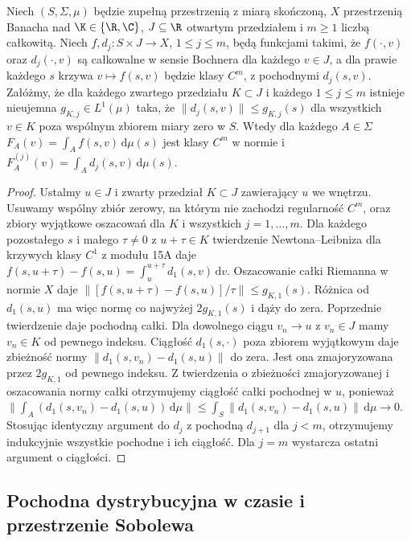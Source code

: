 \begin{wniosek}
\label{cor:dominated-parameter-derivatives15b}
Niech $(S,\Sigma,\mu)$ będzie zupełną przestrzenią z
miarą skończoną, $X$ przestrzenią Banacha nad $\K\in\{\R,\C\}$,
$J\subseteq\R$ otwartym przedziałem i $m\ge1$ liczbą
całkowitą. Niech $f,d_j:S\times J\to X$, $1\le j\le m$,
będą funkcjami takimi, że $f(\cdot,v)$ oraz $d_j(\cdot,v)$
są całkowalne w sensie Bochnera dla każdego $v\in J$,
a dla prawie każdego $s$ krzywa $v\mapsto f(s,v)$
będzie klasy $C^m$, z pochodnymi $d_j(s,v)$.
Załóżmy, że dla każdego zwartego przedziału $K\subset J$
i każdego $1\le j\le m$ istnieje nieujemna
$g_{K,j}\in L^1(\mu)$ taka, że
$\|d_j(s,v)\|\le g_{K,j}(s)$ dla wszystkich $v\in K$
poza wspólnym zbiorem miary zero w $S$.
Wtedy dla każdego $A\in\Sigma$
$F_A(v)=\int_A f(s,v)\,\mathrm d\mu(s)$ jest klasy $C^m$
w normie i $F_A^{(j)}(v)=\int_A d_j(s,v)\,\mathrm d\mu(s)$.
\end{wniosek}
\begin{proof}
Ustalmy $u\in J$ i zwarty przedział $K\subset J$
zawierający $u$ we wnętrzu. Usuwamy wspólny zbiór
zerowy, na którym nie zachodzi regularność $C^m$,
oraz zbiory wyjątkowe oszacowań dla $K$ i wszystkich
$j=1,\ldots,m$. Dla każdego pozostałego $s$ i małego
$\tau\ne0$ z $u+\tau\in K$ twierdzenie Newtona--Leibniza
dla krzywych klasy $C^1$ z modułu 15A daje
$f(s,u+\tau)-f(s,u)=\int_u^{u+\tau}d_1(s,v)\,\mathrm dv$.
Oszacowanie całki Riemanna w normie $X$ daje
$\|[f(s,u+\tau)-f(s,u)]/\tau\|\le g_{K,1}(s)$. Różnica od $d_1(s,u)$
ma więc normę co najwyżej $2g_{K,1}(s)$ i dąży
do zera. Poprzednie twierdzenie daje pochodną całki.
Dla dowolnego ciągu $v_n\to u$ z $v_n\in J$ mamy
$v_n\in K$ od pewnego indeksu. Ciągłość $d_1(s,\cdot)$
poza zbiorem wyjątkowym daje zbieżność normy
$\|d_1(s,v_n)-d_1(s,u)\|$ do zera. Jest ona
zmajoryzowana przez $2g_{K,1}$ od pewnego indeksu.
Z twierdzenia o zbieżności zmajoryzowanej i oszacowania
normy całki otrzymujemy ciągłość całki pochodnej
w $u$, ponieważ
$\|\int_A(d_1(s,v_n)-d_1(s,u))\,\mathrm d\mu\|
\le\int_S\|d_1(s,v_n)-d_1(s,u)\|\,\mathrm d\mu\to0$.
Stosując identyczny argument do $d_j$ z pochodną
$d_{j+1}$ dla $j<m$, otrzymujemy indukcyjnie wszystkie
pochodne i ich ciągłość. Dla $j=m$ wystarcza
ostatni argument o ciągłości.
\end{proof}

\subsection{Pochodna dystrybucyjna w czasie i przestrzenie Sobolewa}

